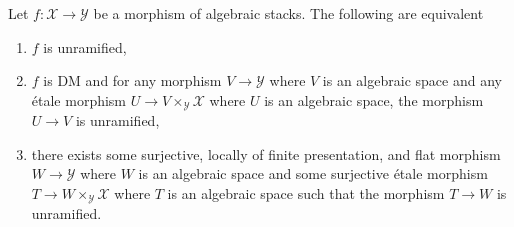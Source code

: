 \begin{lemma}
\label{lemma-unramified}
Let $f : \mathcal{X} \to \mathcal{Y}$ be a morphism of algebraic stacks.
The following are equivalent
\begin{enumerate}
\item $f$ is unramified,
\item $f$ is DM and for any morphism $V \to \mathcal{Y}$
where $V$ is an algebraic space and any \'etale morphism
$U \to V \times_\mathcal{Y} \mathcal{X}$ where $U$ is an algebraic space,
the morphism $U \to V$ is unramified,
\item there exists some surjective, locally of finite presentation, and flat
morphism $W \to \mathcal{Y}$ where $W$ is an algebraic space and some
surjective \'etale morphism $T \to W \times_\mathcal{Y} \mathcal{X}$
where $T$ is an algebraic space such that the morphism $T \to W$ is unramified.
\end{enumerate}
\end{lemma}

